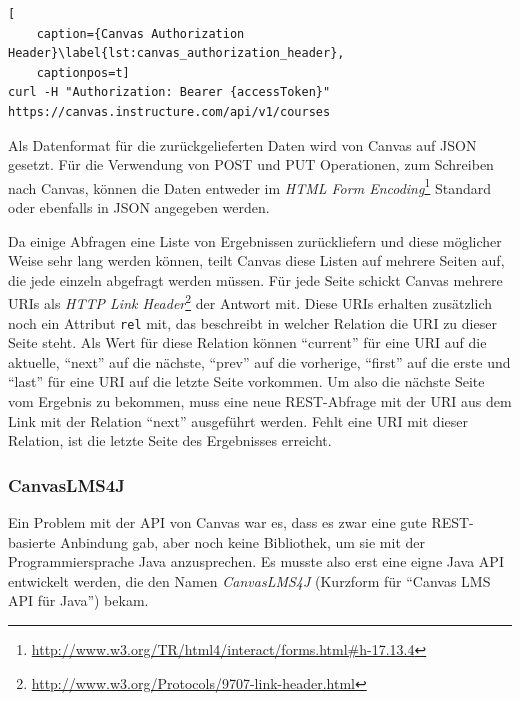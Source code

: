 \begin{lstlisting}[
    caption={Canvas Authorization Header}\label{lst:canvas_authorization_header},
    captionpos=t]
curl -H "Authorization: Bearer {accessToken}" https://canvas.instructure.com/api/v1/courses
\end{lstlisting}

Als Datenformat für die zurückgelieferten Daten wird von Canvas auf JSON gesetzt. Für die Verwendung von POST und PUT Operationen, zum Schreiben nach Canvas, können die Daten entweder im \emph{HTML Form Encoding}\footnote{\url{http://www.w3.org/TR/html4/interact/forms.html\#h-17.13.4}} Standard oder ebenfalls in JSON angegeben werden. 

Da einige Abfragen eine Liste von Ergebnissen zurückliefern und diese möglicher Weise sehr lang werden können, teilt Canvas diese Listen auf mehrere Seiten auf, die jede einzeln abgefragt werden müssen. Für jede Seite schickt Canvas mehrere URIs als \emph{HTTP Link Header}\footnote{\url{http://www.w3.org/Protocols/9707-link-header.html}} der Antwort mit. Diese URIs erhalten zusätzlich noch ein Attribut \texttt{rel} mit, das beschreibt in welcher Relation die URI zu dieser Seite steht.  Als Wert für diese Relation können \enquote{current} für eine URI auf die aktuelle, \enquote{next} auf die nächste, \enquote{prev} auf die vorherige, \enquote{first} auf die erste und \enquote{last} für eine URI auf die letzte Seite vorkommen. Um also die nächste Seite vom Ergebnis zu bekommen, muss eine neue REST-Abfrage mit der URI aus dem Link mit der Relation \enquote{next} ausgeführt werden. Fehlt eine URI mit dieser Relation, ist die letzte Seite des Ergebnisses erreicht. 


\subsubsection{CanvasLMS4J} %
\label{ssub:canvaslms4j}

Ein Problem mit der API von Canvas war es, dass es zwar eine gute REST-basierte Anbindung gab, aber noch keine Bibliothek, um sie mit der Programmiersprache Java anzusprechen. Es musste also erst eine eigne Java API  entwickelt werden, die den Namen \emph{CanvasLMS4J} (Kurzform für \enquote{Canvas LMS API für Java}) bekam. 

